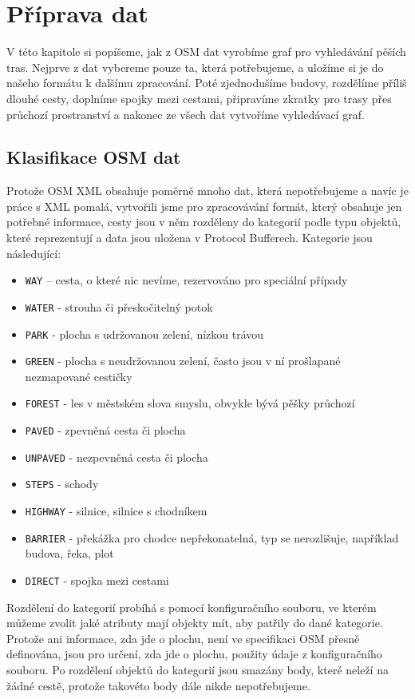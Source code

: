 \chapter{Příprava dat}
V této kapitole si popíšeme, jak z OSM dat vyrobíme graf pro vyhledávání pěších
tras. Nejprve z dat vybereme pouze ta, která potřebujeme, a uložíme si je do
našeho formátu k dalšímu zpracování. Poté zjednodušíme budovy, rozdělíme příliš
dlouhé cesty, doplníme spojky mezi cestami, připravíme zkratky pro trasy přes
průchozí prostranství a nakonec ze všech dat vytvoříme vyhledávací graf.

\section{Klasifikace OSM dat}
Protože OSM XML obsahuje poměrně mnoho dat, která nepotřebujeme a navíc je práce
s XML pomalá, vytvořili jsme pro zpracovávání formát, který obsahuje jen
potřebné informace, cesty jsou v něm rozděleny do kategorií podle typu objektů,
které reprezentují a data jsou uložena v Protocol Bufferech. Kategorie jsou
následující:
\begin{itemize}
	\item \verb|WAY| -- cesta, o které nic nevíme, rezervováno pro speciální
	případy
	\item \verb|WATER| - strouha či přeskočitelný potok
	\item \verb|PARK| - plocha s udržovanou zelení, nízkou trávou
	\item \verb|GREEN| - plocha s neudržovanou zelení, často jsou v ní
	prošlapané nezmapované cestičky
	\item \verb|FOREST| - les v městském slova smyslu, obvykle bývá pěšky
	průchozí
	\item \verb|PAVED| - zpevněná cesta či plocha
	\item \verb|UNPAVED| - nezpevněná cesta či plocha
	\item \verb|STEPS| - schody
	\item \verb|HIGHWAY| - silnice, silnice s chodníkem
	\item \verb|BARRIER| - překážka pro chodce nepřekonatelná, typ se
	nerozlišuje, například budova, řeka, plot
	\item \verb|DIRECT| - spojka mezi cestami
\end{itemize}
Rozdělení do kategorií probíhá s pomocí konfiguračního souboru, ve kterém můžeme
zvolit jaké atributy mají objekty mít, aby patřily do dané kategorie. Protože
ani informace, zda jde o plochu, není ve specifikaci OSM přesně definována, jsou
pro určení, zda jde o plochu, použity údaje z konfiguračního souboru. Po
rozdělení objektů do kategorií jsou smazány body, které neleží na žádné cestě,
protože takovéto body dále nikde nepotřebujeme.

